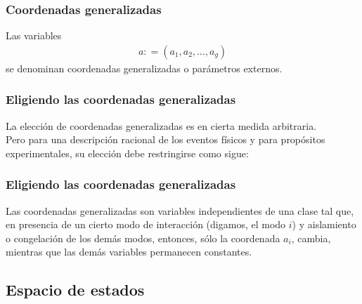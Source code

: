 \documentclass[12pt]{beamer}
\begin{document}
\begin{frame}
\frametitle{Coordenadas generalizadas}
Las variables 
\pause
\begin{align*}
a : = (a_{1}, a_{2}, \ldots, a_{g})
\end{align*}
se denominan coordenadas generalizadas o parámetros externos.
\end{frame}
\begin{frame}
\frametitle{Eligiendo las coordenadas generalizadas}
La elección de coordenadas generalizadas es en cierta medida arbitraria.
\\
\bigskip
\pause
Pero para una descripción racional de los eventos físicos y para propósitos experimentales, su elección debe restringirse como sigue:
\end{frame}
\begin{frame}
\frametitle{Eligiendo las coordenadas generalizadas}
Las coordenadas generalizadas son variables independientes de una clase tal que, en presencia de un cierto modo de interacción (digamos, el modo $i$) y aislamiento o congelación de los demás modos, entonces, sólo la coordenada $a_{i}$, cambia, mientras que las demás variables permanecen constantes.
\end{frame}

\subsection{Espacio de estados}
\end{document}

